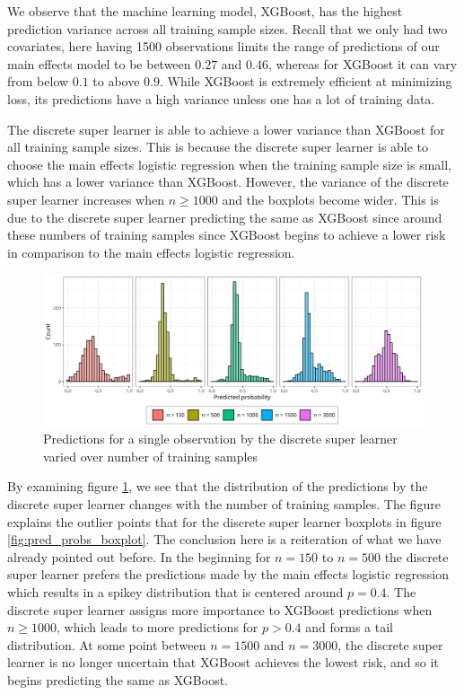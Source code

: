 \documentclass[./main.tex]{subfiles}
\begin{document}
We observe that the machine learning model, XGBoost, has the highest prediction variance across all training sample sizes. Recall that we only had two covariates, here having 1500 observations limits the range of predictions of our main effects model to be between $ 0.27 $ and $ 0.46 $, whereas for XGBoost it can vary from below $ 0.1 $ to above $ 0.9 $. While XGBoost is extremely efficient at minimizing loss, its predictions have a high variance unless one has a lot of training data. 

The discrete super learner is able to achieve a lower variance than XGBoost for all training sample sizes. This is because the discrete super learner is able to choose the main effects logistic regression when the training sample size is small, which has a lower variance than XGBoost. However, the variance of the discrete super learner increases when $ n \geq 1000 $ and the boxplots become wider. This is due to the discrete super learner predicting the same as XGBoost since around these numbers of training samples since XGBoost begins to achieve a lower risk in comparison to the main effects logistic regression. 

\begin{figure}[H]
    \centering
    \includegraphics[width=\textwidth]{figures/preds_dsl_shift.png}
    \caption{Predictions for a single observation by the discrete super learner varied over number of training samples}
    \label{fig:dsl_shift}
\end{figure}
By examining figure \ref{fig:dsl_shift}, we see that the distribution of the predictions by the discrete super learner changes with the number of training samples. The figure explains the outlier points that for the discrete super learner boxplots in figure \ref{fig:pred_probs_boxplot}. The conclusion here is a reiteration of what we have already pointed out before. In the beginning for $ n = 150 $ to $ n = 500 $ the discrete super learner prefers the predictions made by the main effects logistic regression which results in a spikey distribution that is centered around $ p = 0.4 $. The discrete super learner assigns more importance to XGBoost predictions when $n \geq 1000$, which leads to more predictions for $p > 0.4$ and forms a tail distribution. At some point between $ n = 1500 $ and $ n = 3000 $, the discrete super learner is no longer uncertain that XGBoost achieves the lowest risk, and so it begins predicting the same as XGBoost. 
\end{document}
